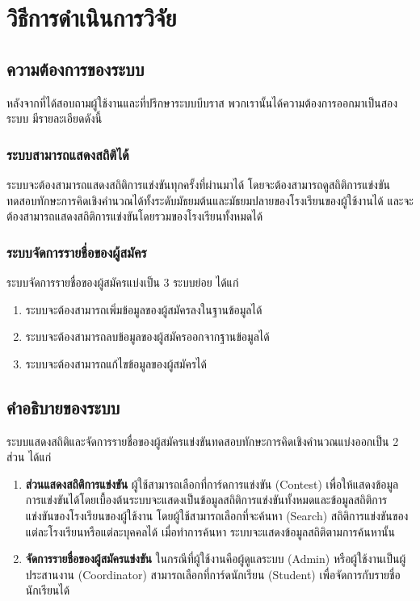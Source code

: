 \chapter{วิธีการดำเนินการวิจัย}
\label{chapter:experiment}

\section{ความต้องการของระบบ}

หลังจากที่ได้สอบถามผู้ใช้งานและที่ปรึกษาระบบบีบราส พวกเรานั้นได้ความต้องการออกมาเป็นสองระบบ มีรายละเอียดดังนี้

\subsection{ระบบสามารถแสดงสถิติได้}

ระบบจะต้องสามารถแสดงสถิติการแข่งขันทุกครั้งที่ผ่านมาได้
โดยจะต้องสามารถดูสถิติการแข่งขันทดสอบทักษะการคิดเชิงคำนวณได้ทั้งระดับมัธยมต้นและมัธยมปลายของโรงเรียนของผู้ใช้งานได้
และจะต้องสามารถแสดงสถิติการแข่งขันโดยรวมของโรงเรียนทั้งหมดได้

\subsection{ระบบจัดการรายชื่อของผู้สมัคร}

ระบบจัดการรายชื่อของผู้สมัครแบ่งเป็น 3 ระบบย่อย ได้แก่

\begin{enumerate}
    \item ระบบจะต้องสามารถเพิ่มข้อมูลของผู้สมัครลงในฐานข้อมูลได้
    \item ระบบจะต้องสามารถลบข้อมูลของผู้สมัครออกจากฐานข้อมูลได้
    \item ระบบจะต้องสามารถแก้ไขข้อมูลของผู้สมัครได้
\end{enumerate}

\section{คำอธิบายของระบบ}

ระบบแสดงสถิติและจัดการรายชื่อของผู้สมัครแข่งขันทดสอบทักษะการคิดเชิงคำนวณแบ่งออกเป็น 2 ส่วน ได้แก่

\begin{enumerate}
    \item \textbf{ส่วนแสดงสถิติการแข่งขัน} ผู้ใช้สามารถเลือกที่การ์ดการแข่งขัน (Contest) เพื่อให้แสดงข้อมูลการแข่งขันได้โดยเบื้องต้นระบบจะแสดงเป็นข้อมูลสถิติการแข่งขันทั้งหมดและข้อมูลสถิติการแข่งขันของโรงเรียนของผู้ใช้งาน โดยผู้ใช้สามารถเลือกที่จะค้นหา (Search) สถิติการแข่งขันของแต่ละโรงเรียนหรือแต่ละบุคคลได้ เมื่อทำการค้นหา ระบบจะแสดงข้อมูลสถิติตามการค้นหานั้น
    \item \textbf{จัดการรายชื่อของผู้สมัครแข่งขัน} ในกรณีที่ผู้ใช้งานคือผู้ดูแลระบบ (Admin) หรือผู้ใช้งานเป็นผู้ประสานงาน (Coordinator) สามารถเลือกที่การ์ดนักเรียน (Student) เพื่อจัดการกับรายชื่อนักเรียนได้
\end{enumerate}

